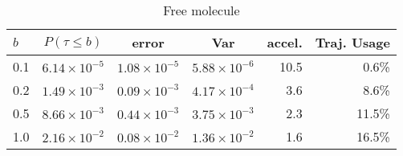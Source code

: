 \documentclass[aip,jcp,a4paper,reprint,onecolumn]{revtex4-1}
\begin{document}
\begin{table}[th]
  \centering
  \caption{Free molecule}
  \begin{tabular*}{0.8\textwidth}{@{\extracolsep{\fill}}lcccrr}
    \hline\hline
    $b$ & $P (\tau \leq b)$ & error & Var & accel. & Traj. Usage \\\hline
    0.1 & $6.14\times 10^{-5}$ & $1.08\times 10^{-5}$ & $5.88\times10^{-6}$ &10.5 & 0.6\%\\
    0.2 & $1.49\times 10^{-3}$ & $0.09\times 10^{-3}$ & $4.17\times10^{-4}$ & 3.6 & 8.6\%\\
    0.5 & $8.66\times 10^{-3}$ & $0.44\times 10^{-3}$ & $3.75\times10^{-3}$ & 2.3 &11.5\%\\
    1.0 & $2.16\times 10^{-2}$ & $0.08\times 10^{-2}$ & $1.36\times10^{-2}$ & 1.6 &16.5\%\\
    \hline\hline
  \end{tabular*}

\end{table}
\end{document}
